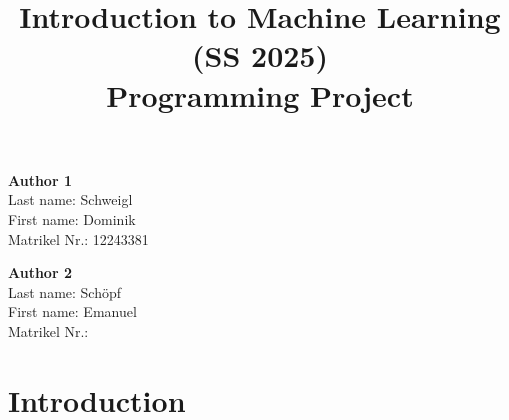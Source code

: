 \documentclass[a4, 10 pt, conference]{ieeeconf}  %
\title{\LARGE \bf
Introduction to Machine Learning (SS 2025)\\ Programming Project
\vspace{-3em}
}
\begin{document}
\maketitle
\vspace{-4em}
\thispagestyle{empty}
\pagestyle{empty}

\begin{strip}
  \begin{tcolorbox}[
      size=tight,
      colback=white,
      boxrule=0.2mm,
      left=3mm,right=3mm, top=0mm, bottom=0mm
    ]
    {\begin{multicols}{3}%

        \textbf{Author 1}       \\
        Last name:    Schweigl    \\  %
        First name:   Dominik    \\  %
        Matrikel Nr.: 12243381              \\  %

        \columnbreak

        \textbf{Author 2}       \\
        Last name:    Schöpf          \\  %
        First name:   Emanuel          \\  %
        Matrikel Nr.:               \\  %

        \columnbreak


      \end{multicols}}
  \end{tcolorbox}
\end{strip}


\section{Introduction}
\label{sec:intro}
\end{document}
